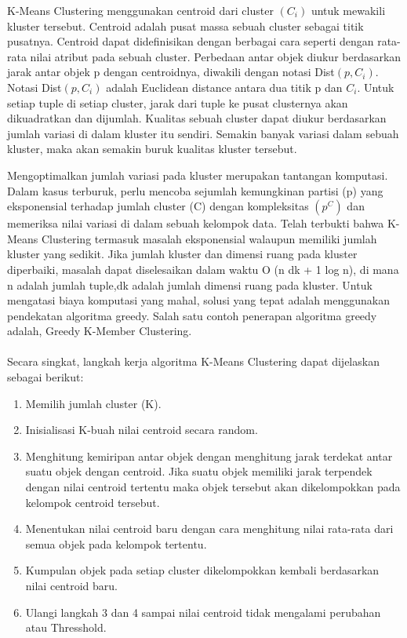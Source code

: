 \par K-Means Clustering menggunakan centroid dari cluster $(C_i)$  untuk mewakili kluster tersebut. Centroid adalah pusat massa sebuah cluster sebagai titik pusatnya. Centroid dapat didefinisikan dengan berbagai cara seperti dengan rata-rata nilai atribut pada sebuah cluster. Perbedaan antar objek diukur berdasarkan jarak antar objek p dengan centroidnya, diwakili dengan notasi Dist$(p, C_i)$. Notasi Dist$(p,C_i)$ adalah Euclidean distance antara dua titik p dan $C_i$. Untuk setiap tuple di setiap cluster, jarak dari tuple ke pusat clusternya akan dikuadratkan dan dijumlah. Kualitas sebuah cluster dapat diukur berdasarkan jumlah variasi di dalam kluster itu sendiri. Semakin banyak variasi dalam sebuah kluster, maka akan semakin buruk kualitas kluster tersebut.

\par Mengoptimalkan jumlah variasi pada kluster merupakan tantangan komputasi. Dalam kasus terburuk, perlu mencoba sejumlah kemungkinan partisi (p) yang eksponensial terhadap jumlah cluster (C) dengan kompleksitas $(p^C)$ dan memeriksa nilai variasi di dalam sebuah kelompok data. Telah terbukti bahwa K-Means Clustering termasuk masalah eksponensial walaupun memiliki jumlah kluster yang sedikit. Jika jumlah kluster dan dimensi ruang pada kluster diperbaiki, masalah dapat diselesaikan dalam waktu O (n dk + 1 log n), di mana n adalah jumlah tuple,dk adalah jumlah dimensi ruang pada kluster. Untuk mengatasi biaya komputasi yang mahal, solusi yang tepat adalah menggunakan pendekatan algoritma greedy. Salah satu contoh penerapan algoritma greedy adalah, Greedy K-Member Clustering.\\
\\
\noindent Secara singkat, langkah kerja algoritma K-Means Clustering dapat dijelaskan sebagai berikut:
\begin{enumerate}
\item Memilih jumlah cluster (K).
\item Inisialisasi K-buah nilai centroid secara random.
\item Menghitung kemiripan antar objek dengan menghitung jarak terdekat antar suatu objek dengan centroid. Jika suatu objek memiliki jarak terpendek dengan nilai centroid tertentu maka objek tersebut akan dikelompokkan pada kelompok centroid tersebut.
\item Menentukan nilai centroid baru dengan cara menghitung nilai rata-rata dari semua objek pada kelompok tertentu.
\item Kumpulan objek pada setiap cluster dikelompokkan kembali berdasarkan nilai centroid baru.
\item Ulangi langkah 3 dan 4 sampai nilai centroid tidak mengalami perubahan atau Thresshold.
\end{enumerate}

